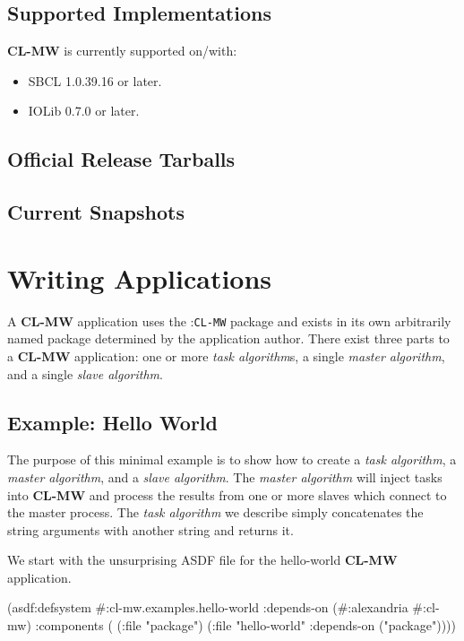 \documentclass[titlepage,12pt]{book}
\newcommand{\xsmall}{\latexhtml{\small}{}}
\newcommand{\xnormalsize}{\latexhtml{\normalsize}{}}
\newcommand{\clmw}{\xsmall\textbf{CL-MW}\xnormalsize\xspace}
\newcommand{\package}[1]{\mbox{:\uppercase{\xsmall\texttt{#1}\xnormalsize}} package\xspace}
\newcommand{\mwpackage}{\package{CL-MW}}
\newcommand{\sa}{\textit{slave algorithm}\xspace}
\newcommand{\ma}{\textit{master algorithm}\xspace}
\newcommand{\ta}{\textit{task algorithm}\xspace}
\newcommand{\tas}{\textit{task algorithm}s\xspace}
\newcommand{\file}[1]{\texttt{#1}\xspace}
\newcommand{\Todo}{\begin{center}\fbox{\textbf{TODO}}\end{center}}
\begin{document}
\section{Supported Implementations}

\clmw is currently supported on/with: 

\begin{itemize}
\item SBCL 1.0.39.16 or later.
\item IOLib 0.7.0 or later.
\end{itemize}

\section{Official Release Tarballs}

\Todo

\section{Current Snapshots}

\Todo

\chapter{Writing Applications}

A \clmw application uses the \mwpackage and exists in its own
arbitrarily named package determined by the application author.
There exist three parts to a \clmw application: one or more \tas,
a single \ma, and a single \sa.

\section{Example: Hello World}

The purpose of this minimal example is to show how to create a \ta, a \ma,
and a \sa. The \ma will inject tasks into \clmw and process the results from
one or more slaves which connect to the master process. The \ta we describe
simply concatenates the string arguments with another string and returns it.

We start with the unsurprising ASDF file for the hello-world \clmw application.

\begin{lisp}[caption=\file{cl-mw.examples.hello-world.asd}]
(asdf:defsystem #:cl-mw.examples.hello-world
  :depends-on (#:alexandria #:cl-mw)
  :components ( (:file "package")
                (:file "hello-world"
                       :depends-on ("package"))))
\end{lisp}
\end{document}
